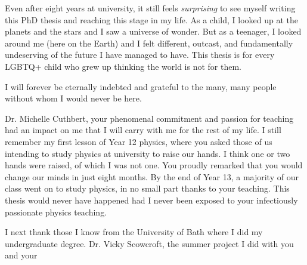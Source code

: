 %
\label{sec:acknowledgement}

Even after eight years at university, it still feels \emph{surprising} to see myself writing this PhD thesis and reaching this stage in my life. As a child, I looked up at the planets and the stars and I saw a universe of wonder. But as a teenager, I looked around me (here on the Earth) and I felt different, outcast, and fundamentally undeserving of the future I have managed to have. This thesis is for every LGBTQ+ child who grew up thinking the world is not for them. %

I will forever be eternally indebted and grateful to the many, many people without whom I would never be here. %

Dr. Michelle Cuthbert, your phenomenal commitment and passion for teaching had an impact on me that I will carry with me for the rest of my life. I still remember my first lesson of Year 12 physics, where you asked those of us intending to study physics at university to raise our hands. I think one or two hands were raised, of which I was not one. You proudly remarked that you would change our minds in just eight months. By the end of Year 13, a majority of our class went on to study physics, in no small part thanks to your teaching. This thesis would never have happened had I never been exposed to your infectiously passionate physics teaching.

I next thank those I know from the University of Bath where I did my undergraduate degree. Dr. Vicky Scowcroft, the summer project I did with you and your %

% 
